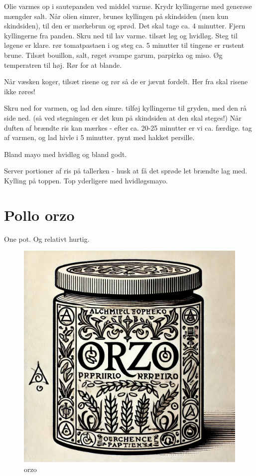\documentclass[
]{book}
\begin{document}
Olie varmes op i sautepanden ved middel varme. Krydr kyllingerne med generøse
mængder salt. Når olien simrer, brunes kyllingen på skindsiden (men kun skindsiden),
til den er mørkebrun og sprød. Det skal tage ca. 4 minutter.
Fjern kyllingerne fra panden. Skru ned til lav varme.
tilsæt løg og hvidløg. Steg til løgene er klare.
rør tomatpastaen i og steg ca. 5 minutter til tingene er rustent brune.
Tilsæt bouillon, salt, røget svampe garum, parpirka og miso. Øg temperatren til høj. Rør for at
blande.

Når væsken koger, tilsæt risene og rør så de er jævnt fordelt. Her fra skal risene ikke røres!

Skru ned for varmen, og lad den simre. tilføj kyllingerne til gryden, med den rå side ned. (så ved stegningen
er det kun på skindsiden at den skal steges!) Når duften af brændte ris kan mærkes - efter ca. 20-25 minutter
er vi ca. færdige. tag af varmen, og lad hivle i 5 minutter. pynt med hakket persille.

Bland mayo med hvidløg og bland godt.

Server portioner af ris på tallerken - husk at få det sprøde let brændte lag med. Kylling på toppen.
Top yderligere med hvidløgsmayo.

\section{Pollo orzo}\label{pollo-orzo}

One pot. Og relativt hurtig.

\begin{figure}
\centering
\includegraphics{images/orzo.png}
\caption{orzo}
\end{figure}
\end{document}
